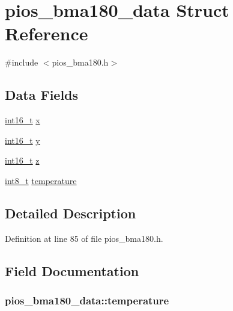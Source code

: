 \hypertarget{structpios__bma180__data}{\section{pios\-\_\-bma180\-\_\-data Struct Reference}
\label{structpios__bma180__data}
}


{\ttfamily \#include $<$pios\-\_\-bma180.\-h$>$}

\subsection*{Data Fields}
\begin{DoxyCompactItemize}
\item 
\hyperlink{stdint_8h_aa343fa3b3d06292b959ffdd4c4703b06}{int16\-\_\-t} \hyperlink{structpios__bma180__data_ab20204f27147fd128d19681833d58a46}{x}
\item 
\hyperlink{stdint_8h_aa343fa3b3d06292b959ffdd4c4703b06}{int16\-\_\-t} \hyperlink{structpios__bma180__data_ac27d83e52f78250976c48fd43d6c7512}{y}
\item 
\hyperlink{stdint_8h_aa343fa3b3d06292b959ffdd4c4703b06}{int16\-\_\-t} \hyperlink{structpios__bma180__data_ac424fcb7679ca4c9956a8c80ad486cc6}{z}
\item 
\hyperlink{stdint_8h_ad566f6541e98b74246db1a3a3a85ad49}{int8\-\_\-t} \hyperlink{structpios__bma180__data_ae7f00e32e40c79bbc387130336cd0e64}{temperature}
\end{DoxyCompactItemize}


\subsection{Detailed Description}


Definition at line 85 of file pios\-\_\-bma180.\-h.



\subsection{Field Documentation}
\hypertarget{structpios__bma180__data_ae7f00e32e40c79bbc387130336cd0e64}{
\subsubsection[{temperature}]{ pios\-\_\-bma180\-\_\-data\-::temperature}}\label{structpios__bma180__data_ae7f00e32e40c79bbc387130336cd0e64}


